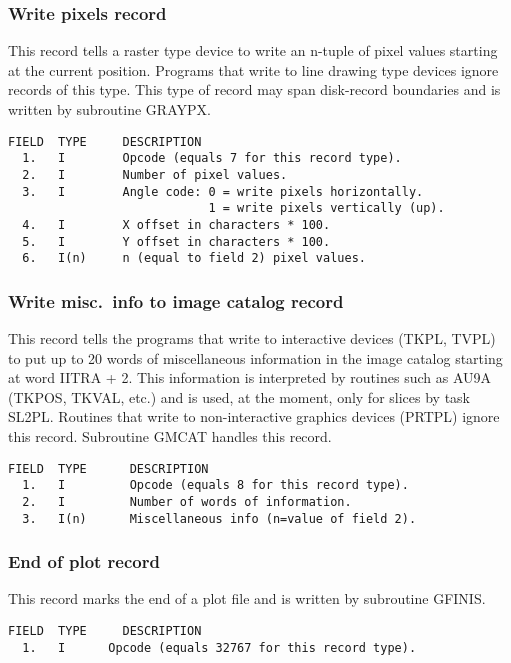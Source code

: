 \subsubsection{Write pixels record}
This record tells a raster type device to write an n-tuple of pixel
values starting at the current position.  Programs that write to line
drawing type devices ignore records of this type.  This type of record
may span disk-record boundaries and is written by subroutine
GRAYPX.

\begin{verbatim}
FIELD  TYPE     DESCRIPTION
  1.   I        Opcode (equals 7 for this record type).
  2.   I        Number of pixel values.
  3.   I        Angle code: 0 = write pixels horizontally.
                            1 = write pixels vertically (up).
  4.   I        X offset in characters * 100.
  5.   I        Y offset in characters * 100.
  6.   I(n)     n (equal to field 2) pixel values.

\end{verbatim}
\subsubsection{Write misc.~info to image catalog record}
This record tells the programs that write to interactive devices
(TKPL, TVPL) to put up to 20 words of miscellaneous information in the
image catalog starting at word IITRA + 2. This information is
interpreted by routines such as AU9A (TKPOS, TKVAL, etc.) and is used,
at the moment, only for slices by task SL2PL. Routines that write to
non-interactive graphics devices (PRTPL) ignore this record.
Subroutine GMCAT handles this record.

\begin{verbatim}
FIELD  TYPE      DESCRIPTION
  1.   I         Opcode (equals 8 for this record type).
  2.   I         Number of words of information.
  3.   I(n)      Miscellaneous info (n=value of field 2).

\end{verbatim}
\subsubsection{End of plot record}
This record marks the end of a plot file and is written by subroutine
GFINIS.

\begin{verbatim}
FIELD  TYPE     DESCRIPTION
  1.   I      Opcode (equals 32767 for this record type).

\end{verbatim}

